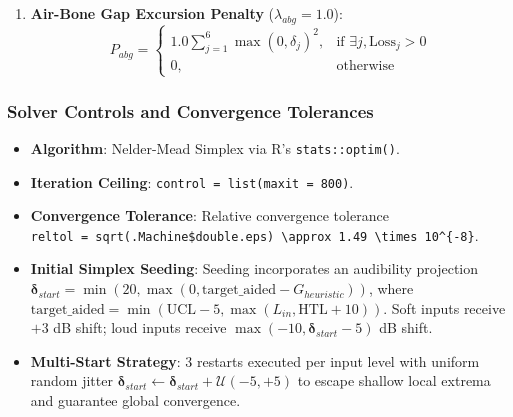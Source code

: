 \documentclass[
]{article}
\providecommand{\tightlist}{%
  \setlength{\itemsep}{0pt}\setlength{\parskip}{0pt}}
\begin{document}
\begin{enumerate}
  \textbf{Compression Ratio Ceiling Penalty} (\(\lambda_{cr} = 200.0\)):
  \begin{equation}
  P_{cr} = \begin{cases} 
  200.0 \sum_{j=1}^6 \max\left(0, (G_{50, j} - G_{65, j}) - \Delta_{max, j}\right)^2, & \text{for } L_{in} = 50 \\ 
  200.0 \sum_{j=1}^6 \max\left(0, (G_{65, j} - G_{80, j}) - \Delta_{max, j}\right)^2, & \text{for } L_{in} = 80 
  \end{cases}
  \end{equation} where
  \(\Delta_{max, j} = 15.0 \cdot (1 - \text{ABG}_j / \max(0.001, \text{HTL}_j))\)
  for soft speech, bounding emergent compression ratios safely below
  3.0:1 for sensorineural loss while enforcing linear amplification for
  conductive components.
\item
  \textbf{Air-Bone Gap Excursion Penalty} (\(\lambda_{abg} = 1.0\)):
  \begin{equation}
  P_{abg} = \begin{cases} 
  1.0 \sum_{j=1}^6 \max(0, \delta_j)^2, & \text{if } \exists j, \text{Loss}_j > 0 \\ 
  0, & \text{otherwise} 
  \end{cases}
  \end{equation}
\end{enumerate}

\subsubsection{Solver Controls and Convergence
Tolerances}\label{solver-controls-and-convergence-tolerances}

\begin{itemize}
\tightlist
\item
  \textbf{Algorithm}: Nelder-Mead Simplex via R's
  \texttt{stats::optim()}.
\item
  \textbf{Iteration Ceiling}: \texttt{control\ =\ list(maxit\ =\ 800)}.
\item
  \textbf{Convergence Tolerance}: Relative convergence tolerance
  \texttt{reltol\ =\ sqrt(.Machine\$double.eps)\ \textbackslash{}approx\ 1.49\ \textbackslash{}times\ 10\^{}\{-8\}}.
\item
  \textbf{Initial Simplex Seeding}: Seeding incorporates an audibility
  projection
  \(\boldsymbol{\delta}_{start} = \min(20, \max(0, \text{target\_aided} - G_{heuristic}))\),
  where
  \(\text{target\_aided} = \min(\text{UCL} - 5, \max(L_{in}, \text{HTL} + 10))\).
  Soft inputs receive \(+3\) dB shift; loud inputs receive
  \(\max(-10, \boldsymbol{\delta}_{start} - 5)\) dB shift.
\item
  \textbf{Multi-Start Strategy}: 3 restarts executed per input level
  with uniform random jitter
  \(\boldsymbol{\delta}_{start} \leftarrow \boldsymbol{\delta}_{start} + \mathcal{U}(-5, +5)\)
  to escape shallow local extrema and guarantee global convergence.
\end{itemize}
\end{document}
